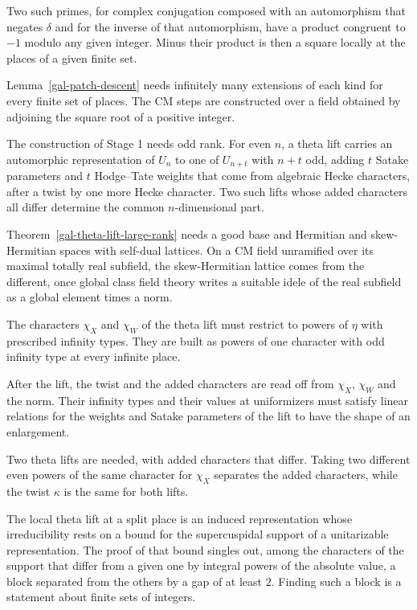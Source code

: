 Two such primes, for complex conjugation composed with an automorphism that negates $\delta$ and for
the inverse of that automorphism, have a product congruent to $-1$ modulo any given integer. Minus
their product is then a square locally at the places of a given finite set.

Lemma~\ref{gal-patch-descent} needs infinitely many extensions of each kind for every finite set of
places. The CM steps are constructed over a field obtained by adjoining the square root of a positive
integer.

The construction of Stage 1 needs odd rank. For even $n$, a theta lift carries an automorphic
representation of $U_n$ to one of $U_{n+t}$ with $n+t$ odd, adding $t$ Satake parameters and $t$
Hodge--Tate weights that come from algebraic Hecke characters, after a twist by one more Hecke
character. Two such lifts whose added characters all differ determine the common $n$-dimensional part.

Theorem~\ref{gal-theta-lift-large-rank} needs a good base and Hermitian and skew-Hermitian spaces with
self-dual lattices. On a CM field unramified over its maximal totally real subfield, the skew-Hermitian
lattice comes from the different, once global class field theory writes a suitable idele of the real
subfield as a global element times a norm.

The characters $\chi_X$ and $\chi_W$ of the theta lift must restrict to powers of $\eta$ with prescribed
infinity types. They are built as powers of one character with odd infinity type at every infinite
place.

After the lift, the twist and the added characters are read off from $\chi_X$, $\chi_W$ and the norm.
Their infinity types and their values at uniformizers must satisfy linear relations for the weights and
Satake parameters of the lift to have the shape of an enlargement.

Two theta lifts are needed, with added characters that differ. Taking two different even powers of the
same character for $\chi_X$ separates the added characters, while the twist $\kappa$ is the same for both
lifts.

The local theta lift at a split place is an induced representation whose irreducibility rests on a bound
for the supercuspidal support of a unitarizable representation. The proof of that bound singles out, among
the characters of the support that differ from a given one by integral powers of the absolute value, a
block separated from the others by a gap of at least $2$. Finding such a block is a statement about finite
sets of integers.


